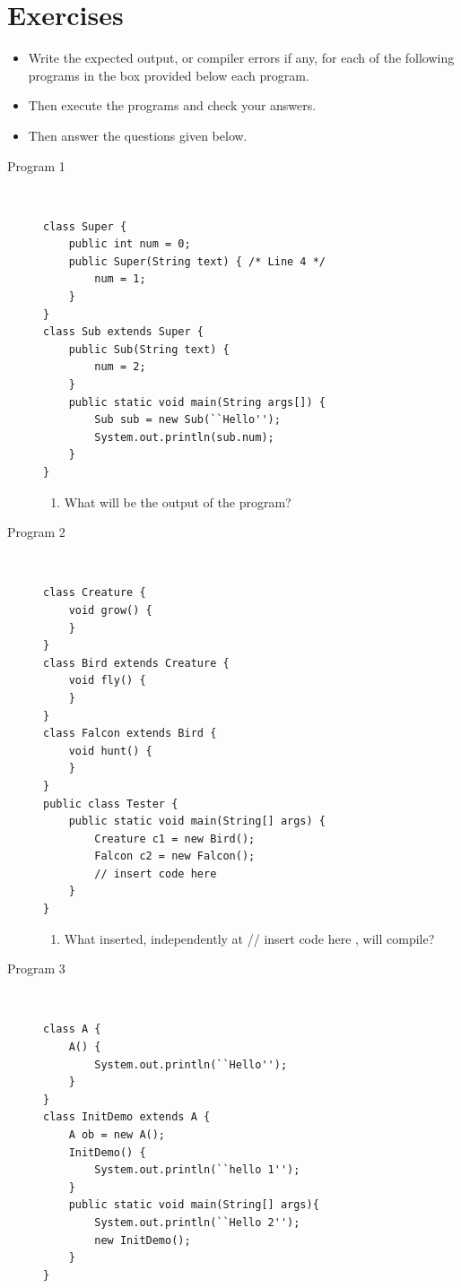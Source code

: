 \documentclass[11pt,a4paper]{article}
\def\AnswerBox{\fbox{\begin{minipage}{4in}\hfill\vspace{0.5in}\end{minipage}}}
\begin{document}
\section*{Exercises}
\begin{itemize}
    \item Write the expected output, or compiler errors if any, for each of the following programs in the box provided below each program.
 \item Then execute the programs and check your answers.
 \item Then answer the questions given below.
\end{itemize}
\begin{description}
\item [Program 1]\
    \begin{lstlisting}
class Super { 
    public int num = 0; 
    public Super(String text) { /* Line 4 */
        num = 1; 
    } 
} 
class Sub extends Super {
    public Sub(String text) {
        num = 2; 
    } 
    public static void main(String args[]) {
        Sub sub = new Sub(``Hello''); 
        System.out.println(sub.num); 
    } 
}
\end{lstlisting}

\AnswerBox

\begin{enumerate}[label=\bfseries Q\arabic*:]\itemsep10pt
        \item What will be the output of the program?
    \end{enumerate}

\item [Program 2] \
\begin{lstlisting}
class Creature {
    void grow() {
    }
}
class Bird extends Creature {
    void fly() {
    }
}
class Falcon extends Bird {
    void hunt() {
    }
}
public class Tester {
    public static void main(String[] args) {
        Creature c1 = new Bird();
        Falcon c2 = new Falcon();
        // insert code here
    }
}
\end{lstlisting}

\AnswerBox

\begin{enumerate}[label=\bfseries Q\arabic*:]\itemsep10pt
\item What inserted, independently at // insert code here , will compile?
\end{enumerate}
                                
\item [Program 3] \
\begin{lstlisting}
class A {
    A() {
        System.out.println(``Hello'');
    }
} 
class InitDemo extends A {
    A ob = new A();
    InitDemo() {
        System.out.println(``hello 1'');
    }
    public static void main(String[] args){
        System.out.println(``Hello 2'');
        new InitDemo();
    }
}
\end{lstlisting}


\end{description}
\end{document}
